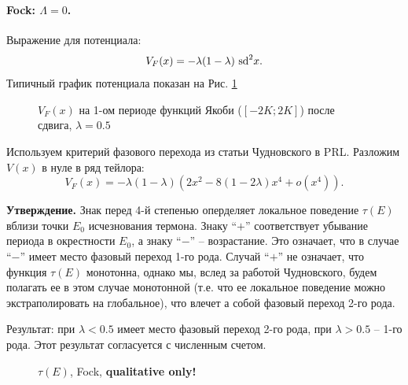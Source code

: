 \documentclass[12pt]{article}
\begin{document}
\paragraph{Fock: $\Lambda = 0$.}
Выражение для потенциала:
%
\begin{equation}
V_F (x) = -\lambda (1 - \lambda)~\textrm{sd}^2 x.
\end{equation}
%
Типичный график потенциала показан на Рис. \ref{pic:potential_fock}
%
\begin{figure}[Ht!]
\caption{$V_F (x)$ на 1-ом периоде функций Якоби ($[-2K; 2K]$) после сдвига, $\lambda = 0.5$}
\label{pic:potential_fock}
\end{figure}
%
Используем критерий фазового перехода из статьи Чудновского в PRL.
Разложим $V(x)$ в нуле в ряд тейлора:
%
\begin{equation}
V_F (x) = -\lambda (1 - \lambda) (2x^2 - 8(1 - 2\lambda)x^4 + o(x^4)).
\end{equation}
%

\textbf{Утверждение.} Знак перед 4-й степенью оперделяет локальное поведение $\tau(E)$ вблизи точки $E_0$ исчезнования термона.
Знаку ``$+$'' соответствует убывание периода в окрестности $E_0$, а знаку ``$-$'' -- возрастание.
Это означает, что в случае ``$-$'' имеет место фазовый переход 1-го рода.
Случай ``$+$'' не означает, что функция $\tau(E)$ монотонна, однако мы, вслед за работой Чудновского, будем полагать ее в этом случае монотонной (т.е. что ее локальное поведение можно экстраполировать на глобальное), что влечет а собой фазовый переход 2-го рода.

Результат: при $\lambda < 0.5$ имеет место фазовый переход 2-го рода, при $\lambda > 0.5$ -- 1-го рода.
Этот результат согласуется с численным счетом.
%
\begin{figure}[Ht!]
\caption{$\tau(E)$, Fock, {\bf qualitative only!}}
\end{figure}
%
\end{document}
